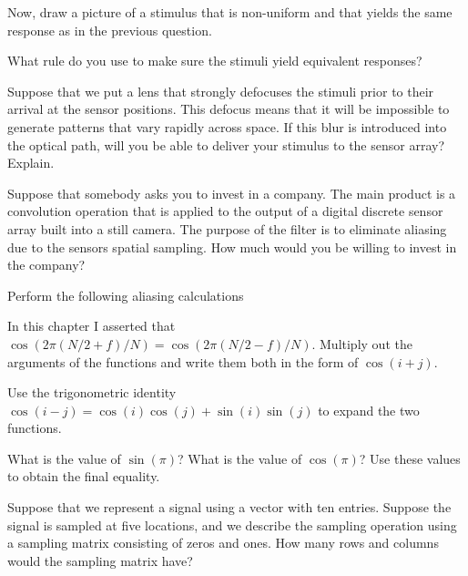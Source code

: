  \item  Now, draw a picture of a stimulus that is non-uniform
and that yields the same response as in the previous question.

 \item  What rule do you use to make sure the
stimuli yield equivalent responses?

 \item  Suppose that we put a lens that strongly
defocuses the stimuli prior to their arrival
at the sensor positions.
This defocus means that it will be impossible to generate
patterns that vary rapidly across space.
If this blur is introduced into
the optical path, will you be able to deliver your stimulus
to the sensor array?
Explain.

 \item Suppose that somebody asks you to invest in a
company.  The main product is a convolution operation
that is applied to the output of a digital discrete sensor array
built into a still camera.
The purpose of the filter is to eliminate aliasing due to
the sensors spatial sampling.
How much would you be willing to invest in the company?

 \ee

\item Perform the following aliasing calculations
\label{q:aliasing}
 \be

 \item In this chapter I asserted that
$\cos (2 \pi ( { N / 2}  + f) / N) = \cos (2 \pi ( { N / 2 } - f ) / N)$.
Multiply out the arguments of the
functions and write them both in the form of $\cos ( i + j )$.

 \item  Use the trigonometric identity 
$\cos (i - j) = \cos(i) \cos(j) + \sin(i) \sin (j)$
to expand the two functions.


 \item What is the value of $\sin ( \pi )$?
What is the value of $\cos( \pi )$?
Use these values to obtain the final equality.

 \item Suppose that we represent a signal using a vector with
ten entries.  Suppose the signal is sampled at
five locations, and we describe the sampling operation
using a sampling matrix consisting of zeros and ones.
How many rows and columns would the sampling matrix have?

